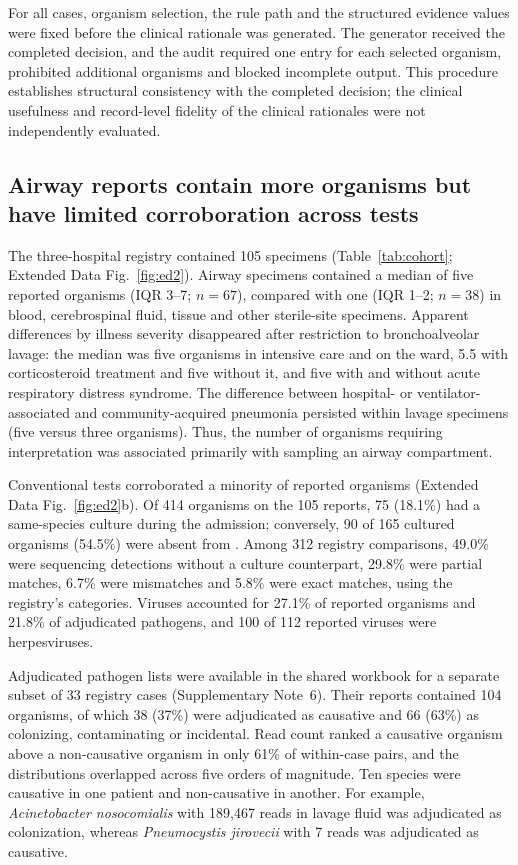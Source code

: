 For all cases, organism selection, the rule path and the structured evidence values were fixed before the clinical rationale was generated. The generator received the completed decision, and the audit required one entry for each selected organism, prohibited additional organisms and blocked incomplete output. This procedure establishes structural consistency with the completed decision; the clinical usefulness and record-level fidelity of the clinical rationales were not independently evaluated.

\subsection*{Airway \mngs reports contain more organisms but have limited corroboration across tests}

The three-hospital registry contained 105 \mngs specimens (Table~\ref{tab:cohort}; Extended Data Fig.~\ref{fig:ed2}). Airway specimens contained a median of five reported organisms (IQR 3--7; $n=67$), compared with one (IQR 1--2; $n=38$) in blood, cerebrospinal fluid, tissue and other sterile-site specimens. Apparent differences by illness severity disappeared after restriction to bronchoalveolar lavage: the median was five organisms in intensive care and on the ward, 5.5 with corticosteroid treatment and five without it, and five with and without acute respiratory distress syndrome. The difference between hospital- or ventilator-associated and community-acquired pneumonia persisted within lavage specimens (five versus three organisms). Thus, the number of organisms requiring interpretation was associated primarily with sampling an airway compartment.

Conventional tests corroborated a minority of reported organisms (Extended Data Fig.~\ref{fig:ed2}b). Of 414 organisms on the 105 \mngs reports, 75 (18.1\%) had a same-species culture during the admission; conversely, 90 of 165 cultured organisms (54.5\%) were absent from \mngs. Among 312 registry comparisons, 49.0\% were sequencing detections without a culture counterpart, 29.8\% were partial matches, 6.7\% were mismatches and 5.8\% were exact matches, using the registry's categories. Viruses accounted for 27.1\% of reported organisms and 21.8\% of adjudicated pathogens, and 100 of 112 reported viruses were herpesviruses.

Adjudicated pathogen lists were available in the shared workbook for a separate subset of 33 registry cases (Supplementary Note~6). Their \mngs reports contained 104 organisms, of which 38 (37\%) were adjudicated as causative and 66 (63\%) as colonizing, contaminating or incidental. Read count ranked a causative organism above a non-causative organism in only 61\% of within-case pairs, and the distributions overlapped across five orders of magnitude. Ten species were causative in one patient and non-causative in another. For example, \textit{Acinetobacter nosocomialis} with 189,467 reads in lavage fluid was adjudicated as colonization, whereas \textit{Pneumocystis jirovecii} with 7 reads was adjudicated as causative.

